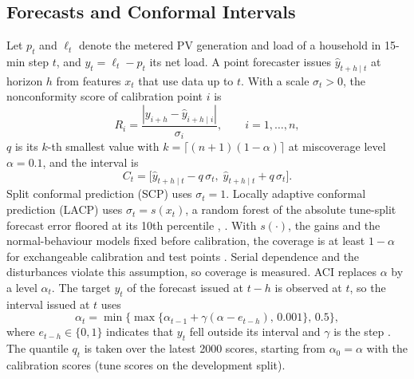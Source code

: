 \documentclass[conference,a4paper]{IEEEtran}
\begin{document}
\subsection{Forecasts and Conformal Intervals}
Let $p_t$ and $\ell_t$ denote the metered PV generation and load of a household in 15-min step $t$, and
$y_t=\ell_t-p_t$ its net load. A point forecaster issues $\hat y_{t+h\mid t}$ at horizon $h$ from features
$x_t$ that use data up to $t$. With a scale $\sigma_t>0$, the nonconformity score of calibration point $i$ is
\begin{equation}
R_i=\frac{|y_{i+h}-\hat y_{i+h\mid i}|}{\sigma_i},\qquad i=1,\dots,n, \label{eq:score}
\end{equation}
$q$ is its $k$-th smallest value with $k=\lceil (n+1)(1-\alpha)\rceil$ at miscoverage level $\alpha=0.1$, and the
interval is
\begin{equation}
C_t=\big[\hat y_{t+h\mid t}-q\,\sigma_t,\;\hat y_{t+h\mid t}+q\,\sigma_t\big]. \label{eq:interval}
\end{equation}
Split conformal prediction (SCP) uses $\sigma_t=1$. Locally adaptive conformal prediction (LACP) uses
$\sigma_t=s(x_t)$, a random forest of the absolute tune-split forecast error floored at its 10th percentile
\cite[Sec.~5.2]{lei}, \cite[eq.~(16)]{papadopoulos11}. With $s(\cdot)$, the gains and the normal-behaviour models
fixed before calibration, the coverage is at least $1-\alpha$ for exchangeable calibration and test points
\cite[Thm.~2.2]{lei}. Serial dependence and the disturbances violate this assumption, so coverage is measured. ACI
replaces $\alpha$ by a level $\alpha_t$. The target $y_t$ of the forecast issued at $t-h$ is observed at $t$, so
the interval issued at $t$ uses
\begin{equation}
\alpha_{t}=\min\{\max\{\alpha_{t-1}+\gamma(\alpha-e_{t-h}),\,0.001\},\,0.5\}, \label{eq:aci}
\end{equation}
where $e_{t-h}\in\{0,1\}$ indicates that $y_t$ fell outside its interval and $\gamma$ is the step
\cite[eq.~(2)]{gibbs}. The quantile $q_t$ is taken over the latest 2000 scores, starting from $\alpha_0=\alpha$
with the calibration scores (tune scores on the development split).
\end{document}
